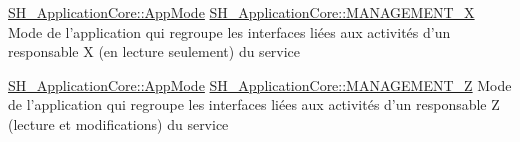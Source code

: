 \hyperlink{classSH__ApplicationCore_a6b93b2f83a290305f282616eb2935899}{S\-H\-\_\-\-Application\-Core\-::\-App\-Mode} \hyperlink{classSH__ApplicationCore_a6b93b2f83a290305f282616eb2935899ae3d0d6045024cbde467f9c8cb536c6a8}{S\-H\-\_\-\-Application\-Core\-::\-M\-A\-N\-A\-G\-E\-M\-E\-N\-T\-\_\-\-X} Mode de l'application qui regroupe les interfaces liées aux activités d'un responsable X (en lecture seulement) du service

\hyperlink{classSH__ApplicationCore_a6b93b2f83a290305f282616eb2935899}{S\-H\-\_\-\-Application\-Core\-::\-App\-Mode} \hyperlink{classSH__ApplicationCore_a6b93b2f83a290305f282616eb2935899ad68aea91f508ecc6cc9fe1430ddccaf1}{S\-H\-\_\-\-Application\-Core\-::\-M\-A\-N\-A\-G\-E\-M\-E\-N\-T\-\_\-\-Z} Mode de l'application qui regroupe les interfaces liées aux activités d'un responsable Z (lecture et modifications) du service


